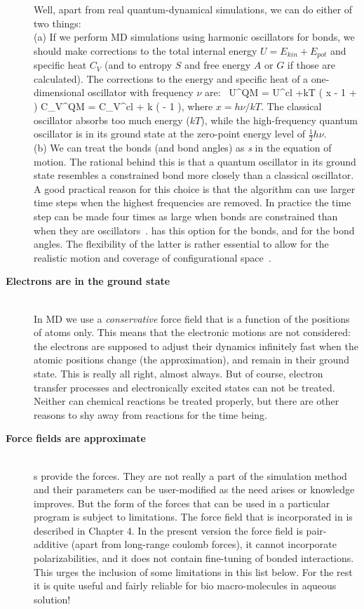 \begin{description}
Well, apart from real quantum-dynamical simulations, we can do either
of two things: \\ (a) If we perform MD simulations using harmonic
oscillators for bonds, we should make corrections to the total
internal energy $U = E_{kin} + E_{pot}$ and specific heat $C_V$ (and
to entropy $S$ and free energy $A$ or $G$ if those are
calculated). The corrections to the energy and specific heat of a
one-dimensional oscillator with frequency $\nu$
are:~\cite{McQuarrie76}
\beq
 U^{QM} = U^{cl} +kT \left( \half x - 1 +  \right)
\eeq
\beq
 C_V^{QM} = C_V^{cl} + k \left(  - 1 \right), 
\eeq
where $x=h\nu /kT$. The classical oscillator absorbs too much energy
($kT$), while the high-frequency quantum oscillator is in its ground
state at the zero-point energy level of $\frac{1}{2} h\nu$. \\ (b) We
can treat the bonds (and bond angles) as {\em {}s}
in the equation of motion. The rational behind this is that a quantum
oscillator in its ground state resembles a constrained bond more
closely than a classical oscillator. A good practical reason for this
choice is that the algorithm can use larger time steps when the
highest frequencies are removed. In practice the time step can be made
four times as large when bonds are constrained than when they are
oscillators~\cite{Gunsteren77}. {\gromacs} has this option for the
bonds, and for the bond angles.  The flexibility of the latter is
rather essential to allow for the realistic motion and coverage of
configurational space~\cite{Gunsteren77}.

\item[{\bf Electrons are in the ground state}]\mbox{}\\
In MD we use a {\em conservative} force field that is a
function of the positions of atoms only.  This means that the
electronic motions are not considered: the electrons are supposed to
adjust their dynamics infinitely fast when the atomic positions change
(the {\em {}} approximation), and remain in
their ground state. This is really all right, almost always. But of
course, electron transfer processes and electronically excited states
can not be treated. Neither can chemical reactions be treated
properly, but there are other reasons to shy away from reactions for
the time being.

\item[{\bf Force fields are approximate}]\mbox{}\\
s provide the forces. They are not really a part of the
simulation method and their parameters can be user-modified as the
need arises or knowledge improves. But the form of the forces that can
be used in a particular program is subject to limitations. The force
field that is incorporated in {\gromacs} is described in Chapter 4. In
the present version the force field is pair-additive (apart from
long-range coulomb forces), it cannot incorporate
polarizabilities, and it does not contain fine-tuning of bonded
interactions. This urges the inclusion of some limitations in this
list below.  For the rest it is quite useful and fairly reliable for
bio macro-molecules in aqueous solution!


\end{description}
